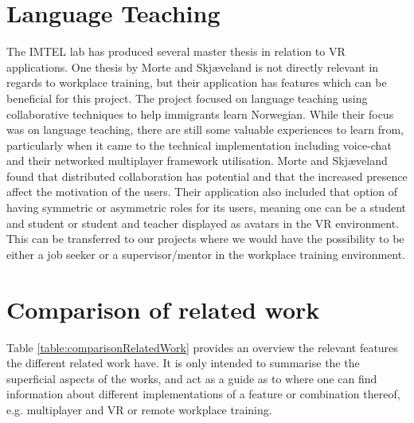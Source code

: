\section{Language Teaching}
The IMTEL lab has produced several master thesis in relation to VR applications. One thesis by  Morte and Skjæveland \cite{morte2019effects} is not directly relevant in regards to workplace training, but their application has features which can be beneficial for this project. The project focused on language teaching using collaborative techniques to help immigrants learn Norwegian. While their focus was on language teaching, there are still some valuable experiences to learn from, particularly when it came to the technical implementation including voice-chat and their networked multiplayer framework utilisation. Morte and Skjæveland found that distributed collaboration has potential and that the increased presence affect the motivation of the  users. Their application also included that option of having symmetric or asymmetric roles for its users, meaning one can be a student and student or student and teacher displayed as avatars in the VR environment. This can be transferred to our projects where we would have the possibility to be either a job seeker or a supervisor/mentor in the workplace training environment.     

\section{Comparison of related work}
 
Table \ref{table:comparisonRelatedWork} provides an overview the relevant features the different related work have. It is only intended to summarise the the superficial aspects of the works, and act as a guide as to where one can find information about different implementations of a feature or combination thereof, e.g. multiplayer and VR or remote workplace training.


